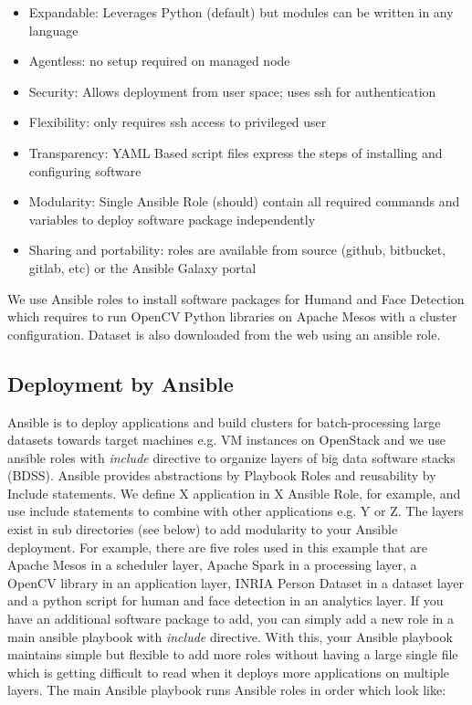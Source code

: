 \begin{itemize}
\tightlist
\item
  Expandable: Leverages Python (default) but modules can be written in
  any language
\item
  Agentless: no setup required on managed node
\item
  Security: Allows deployment from user space; uses ssh for
  authentication
\item
  Flexibility: only requires ssh access to privileged user
\item
  Transparency: YAML Based script files express the steps of installing
  and configuring software
\item
  Modularity: Single Ansible Role (should) contain all required commands
  and variables to deploy software package independently
\item
  Sharing and portability: roles are available from source (github,
  bitbucket, gitlab, etc) or the Ansible Galaxy portal
\end{itemize}

We use Ansible roles to install software packages for Humand and Face
Detection which requires to run OpenCV Python libraries on Apache Mesos
with a cluster configuration. Dataset is also downloaded from the web
using an ansible role.

\subsection{Deployment by Ansible}\label{deployment-by-ansible}

Ansible is to deploy applications and build clusters for
batch-processing large datasets towards target machines e.g. VM
instances on OpenStack and we use ansible roles with \emph{include}
directive to organize layers of big data software stacks (BDSS). Ansible
provides abstractions by Playbook Roles and reusability by Include
statements. We define X application in X Ansible Role, for example, and
use include statements to combine with other applications e.g. Y or Z.
The layers exist in sub directories (see below) to add modularity to
your Ansible deployment. For example, there are five roles used in this
example that are Apache Mesos in a scheduler layer, Apache Spark in a
processing layer, a OpenCV library in an application layer, INRIA Person
Dataset in a dataset layer and a python script for human and face
detection in an analytics layer. If you have an additional software
package to add, you can simply add a new role in a main ansible playbook
with \emph{include} directive. With this, your Ansible playbook
maintains simple but flexible to add more roles without having a large
single file which is getting difficult to read when it deploys more
applications on multiple layers. The main Ansible playbook runs Ansible
roles in order which look like:

